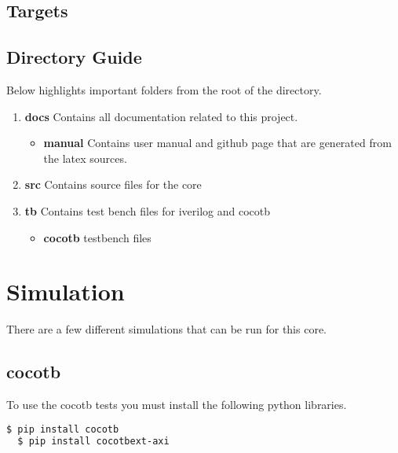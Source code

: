 

\subsection{Targets}



\subsection{Directory Guide}

\par
Below highlights important folders from the root of the directory.

\begin{enumerate}
  \item \textbf{docs} Contains all documentation related to this project.
    \begin{itemize}
      \item \textbf{manual} Contains user manual and github page that are generated from the latex sources.
    \end{itemize}
  \item \textbf{src} Contains source files for the core
  \item \textbf{tb} Contains test bench files for iverilog and cocotb
    \begin{itemize}
      \item \textbf{cocotb} testbench files
    \end{itemize}
\end{enumerate}

\newpage

\section{Simulation}
\par
There are a few different simulations that can be run for this core.

\subsection{cocotb}
\par
To use the cocotb tests you must install the following python libraries.
\begin{lstlisting}[language=bash]
  $ pip install cocotb
  $ pip install cocotbext-axi
\end{lstlisting}

